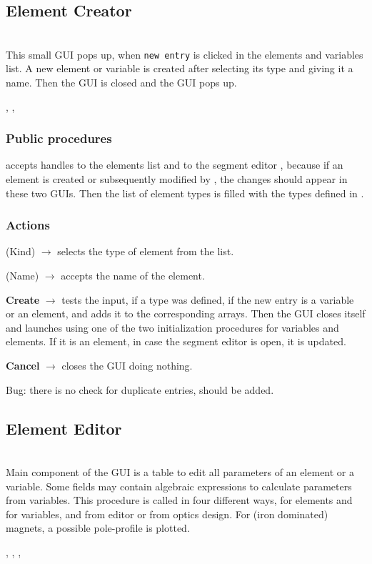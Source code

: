 \documentclass[12pt]{article}
\newcommand\code[1]{{\tt #1}}
\newcommand{\ofld}[1]{\colorbox{black!15}{{\bf #1}}}
\newcommand{\ofldx}[1]{\colorbox{black!15}{(#1)}}
\newcommand\guico[1]{{\color{blue}\code{#1}}}
\newcommand{\evcod}[2]{\ofld{#1} $\rightarrow$ \guico{#2}}
\newcommand{\evcodx}[2]{\ofldx{#1} $\rightarrow$ \guico{#2}}
\newcommand{\opagui}[1]{\colorbox{blue!20}{{\color{black}\code{#1}}}}
\newcommand{\oguih}[2]{\subsection{\label{#2}#1}{\Huge\opagui{#2}}\\}
\newcommand{\ogui}[1]{\hyperref[#1]{\opagui{#1}}}
\newcommand{\opaguif}[1]{\colorbox{violet!30}{{\color{black}\code{#1}}}}
\newcommand{\oguif}[1]{\hyperref[#1]{\opaguif{#1}}}
\newcommand{\opauni}[1]{\colorbox{orange!30}{{\color{black}\code{#1}}}}
\newcommand{\ouni}[1]{\hyperref[#1]{\opauni{#1}}}
\newcommand{\uses}[1]{\flushleft {\bf Uses:} #1}
\newcommand{\desc}[1]{#1}
\newcommand{\act}[1]{\subsubsection*{Actions} #1}
\newcommand{\ppro}[1]{\subsubsection*{Public procedures} #1}
\newcommand{\todo}[1]{{\color{red} #1}}
\begin{document}
\oguih{Element Creator}{oelecreate} 

\desc{This small GUI pops up, when \code{new entry} is clicked in the \ouni{opaeditor} elements and variables list. A new element or variable is created after selecting its type and giving it a name. Then the GUI is closed and the \ogui{oeleedit} GUI pops up.}

\uses{\ouni{globlib}, \ogui{oeleedit}, \ogui{osegedit} }   
\ppro{
\guico{Init} accepts handles to the \ogui{opaeditor} elements list and to the segment editor \ouni{osegedit}, because if an element is created or subsequently modified by \ogui{oeleedit}, the changes should appear in these two GUIs. Then the list of element types is filled with the types defined in \ouni{globlib}.
}

\act{
\evcodx{Kind}{ComETypeChange} selects the type of element from the list.

\evcodx{Name}{EdENameChange} accepts the name of the element.

\evcod{Create}{ButCreClick} tests the input, if a type was defined, if the new entry is a variable or an element, and adds it to the corresponding arrays. Then the GUI closes itself and launches \ogui{oeleedit} using one of the two initialization procedures for variables and elements. If it is an element, in case  the segment editor \ogui{osegedit} is open, it is updated.

\evcod{Cancel}{ButCanClick} closes the GUI doing nothing.
}

\todo{Bug: there is no check for duplicate entries, should be added.}


\oguih{Element Editor}{oeleedit} 

\desc{
Main component of the GUI is a table to edit all parameters of an element or a variable. Some fields may contain algebraic expressions to calculate parameters from variables. This procedure is called in four different ways, for elements and for variables, and from editor or from optics design. For (iron dominated) magnets, a possible pole-profile is plotted.
}

\uses{\ouni{globlib}, \ouni{linoplib}, \oguif{../com/asfigure}, \ouni{../com/asaux}}
\end{document}
